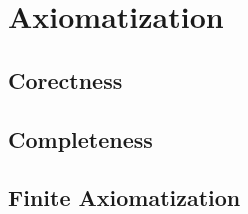 \documentclass{article}
\begin{document}
\section{Axiomatization}
\subsection{Corectness}
\subsection{Completeness}
\subsection{Finite Axiomatization}
\end{document}
